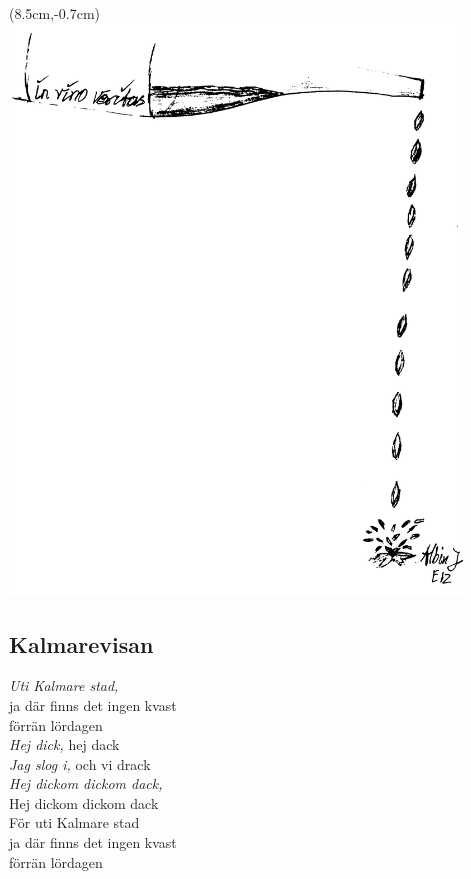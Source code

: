 \begin{textblock*}{3cm}(8.5cm,-0.7cm) %
    \includegraphics[width=12cm]{./bilder/in_vino_veritas.png}
\end{textblock*}

\subsection*{Kalmarevisan} 

\noindent \textit{Uti Kalmare stad,} \\
\noindent ja där finns det ingen kvast \\
\noindent förrän lördagen \\

\noindent \textit{Hej dick,} hej dack\\
\noindent \textit{Jag slog i,} och vi drack\\
\noindent \textit{Hej dickom dickom dack,}\\
\noindent Hej dickom dickom dack\\
\noindent För uti Kalmare stad\\
\noindent ja där finns det ingen kvast\\
\noindent förrän lördagen\\

